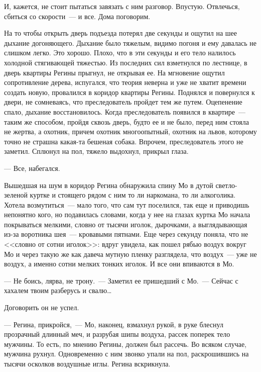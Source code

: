 И, кажется, не стоит пытаться завязать с ним разговор. Впустую. Отвлечься, 
сбиться со скорости~--- и все. Дома поговорим.



На то чтобы открыть дверь подъезда потерял две секунды и ощутил на шее дыхание 
догоняющего. Дыхание было тяжелым, видимо погоня и ему давалась не слишком 
легко. Это хорошо. Плохо, что в эти секунды и его тело налилось холодной 
стягивающей тяжестью. Из последних сил взметнулся по лестнице, в дверь квартиры 
Регины прыгнул, не открывая ее. На мгновение ощутил сопротивление дерева, 
испугался, что теория неверна и уже не хватит времени создать новую, провалился 
в коридор квартиры Регины. Поднялся и повернулся к двери, не сомневаясь, что 
преследователь пройдет тем же путем. Оцепенение спало, дыхание восстановилось. 
Когда преследователь появился в квартире~--- таким же способом, пройдя сквозь 
дверь, будто ее и не было, перед ним стояла не жертва, а охотник, причем 
охотник 
многоопытный, охотник на львов, которому точно не страшна какая-та бешеная 
собака. Впрочем, преследователь этого не заметил. Сплюнул на пол, тяжело 
выдохнул, прикрыл глаза.


\noindent --- Все, набегался.

Вышедшая на шум в коридор Регина обнаружила спину Мо в дутой светло-зеленой 
куртке и стоящего рядом с ним то ли наркомана, то ли алкоголика. Хотела 
возмутиться~--- мало того, что сам тут поселился, так еще и приводишь непонятно 
кого, но подавилась словами, когда у нее на глазах куртка Мо начала покрываться 
мелкими, словно от тысячи иголок, дырочками, а выглядывающая из-за воротника 
шея~--- кровавыми пятнами. Еще через секунду поняла, что не <<словно от сотни 
иголок>>: вдруг увидела, как пошел рябью воздух вокруг Мо и через такую же как давеча 
мутную пленку разглядела, что воздух~--- уже не воздух, а именно сотни мелких 
тонких иголок. И все они впиваются в Мо.


\noindent --- Не боись, лярва, не трону.~--- Заметил ее пришедший с Мо.~--- Сейчас с 
хахалем твоим разберусь и свалю\ldots


Договорить он не успел.


\noindent --- Регина, прикройся,~--- Мо, наконец, взмахнул рукой, в руке блеснул прозрачный 
длинный меч, и разрубая шипы воздуха, рассек поперек тело мужчины. То есть, по 
мнению Регины, должен был рассечь. Во всяком случае, мужчина рухнул. 
Одновременно с ним звонко упали на пол, раскрошившись на тысячи осколков 
воздушные иглы. Регина вскрикнула.


